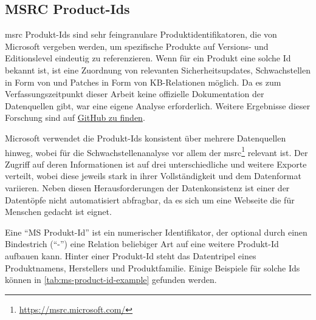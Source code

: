 \subsection{MSRC Product-Ids}\label{subsec:msrc-product-ids}

\acrshort{msrc} Produkt-Ids sind sehr feingranulare Produktidentifikatoren, die von Microsoft vergeben werden, um spezifische Produkte auf Versions- und Editionslevel eindeutig zu referenzieren.
Wenn für ein Produkt eine solche Id bekannt ist, ist eine Zuordnung von relevanten Sicherheitsupdates, Schwachstellen in Form von  und Patches in Form von KB-Relationen möglich.
Da es zum Verfassungszeitpunkt dieser Arbeit keine offizielle Dokumentation der Datenquellen gibt, war eine eigene Analyse erforderlich.
Weitere Ergebnisse dieser Forschung sind auf \href{https://web.archive.org/web/20250706140027/https://github.com/org-metaeffekt/metaeffekt-documentation/blob/main/metaeffekt-vulnerability-management/data-mirror/msrc/understanding-data.md}{GitHub zu finden}.

Microsoft verwendet die Produkt-Ids konsistent über mehrere Datenquellen hinweg, wobei für die Schwachstellenanalyse vor allem der \acrfull{msrc}\footnote{\url{https://msrc.microsoft.com/}} relevant ist.
Der Zugriff auf deren Informationen ist auf drei unterschiedliche  und weitere Exporte verteilt, wobei diese jeweils stark in ihrer Vollständigkeit und dem Datenformat variieren.
Neben diesen Herausforderungen der Datenkonsistenz ist einer der Datentöpfe nicht automatisiert abfragbar, da es sich um eine Webseite die für Menschen gedacht ist eignet.

Eine \enquote{MS Produkt-Id} ist ein numerischer Identifikator, der optional durch einen Bindestrich (\enquote{-}) eine Relation beliebiger Art auf eine weitere Produkt-Id aufbauen kann.
Hinter einer Produkt-Id steht das Datentripel eines Produktnamens, Herstellers und Produktfamilie.
Einige Beispiele für solche Ids können in \autoref{tab:ms-product-id-example} gefunden werden.

